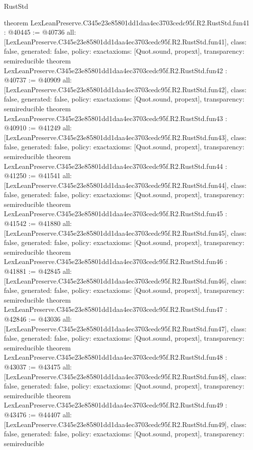 \begin{lexlean}{RustStd}
\begin{coremodule}
{}
theorem LexLeanPreserve.C345e23e85801dd1daa4ec3703cedc95f.R2.RustStd.fun41 : @40445 := @40736 {
  all: [LexLeanPreserve.C345e23e85801dd1daa4ec3703cedc95f.R2.RustStd.fun41],
  class: false,
  generated: false,
  policy: exact{axioms: [Quot.sound, propext]},
  transparency: semireducible
}
theorem LexLeanPreserve.C345e23e85801dd1daa4ec3703cedc95f.R2.RustStd.fun42 : @40737 := @40909 {
  all: [LexLeanPreserve.C345e23e85801dd1daa4ec3703cedc95f.R2.RustStd.fun42],
  class: false,
  generated: false,
  policy: exact{axioms: [Quot.sound, propext]},
  transparency: semireducible
}
theorem LexLeanPreserve.C345e23e85801dd1daa4ec3703cedc95f.R2.RustStd.fun43 : @40910 := @41249 {
  all: [LexLeanPreserve.C345e23e85801dd1daa4ec3703cedc95f.R2.RustStd.fun43],
  class: false,
  generated: false,
  policy: exact{axioms: [Quot.sound, propext]},
  transparency: semireducible
}
theorem LexLeanPreserve.C345e23e85801dd1daa4ec3703cedc95f.R2.RustStd.fun44 : @41250 := @41541 {
  all: [LexLeanPreserve.C345e23e85801dd1daa4ec3703cedc95f.R2.RustStd.fun44],
  class: false,
  generated: false,
  policy: exact{axioms: [Quot.sound, propext]},
  transparency: semireducible
}
theorem LexLeanPreserve.C345e23e85801dd1daa4ec3703cedc95f.R2.RustStd.fun45 : @41542 := @41880 {
  all: [LexLeanPreserve.C345e23e85801dd1daa4ec3703cedc95f.R2.RustStd.fun45],
  class: false,
  generated: false,
  policy: exact{axioms: [Quot.sound, propext]},
  transparency: semireducible
}
theorem LexLeanPreserve.C345e23e85801dd1daa4ec3703cedc95f.R2.RustStd.fun46 : @41881 := @42845 {
  all: [LexLeanPreserve.C345e23e85801dd1daa4ec3703cedc95f.R2.RustStd.fun46],
  class: false,
  generated: false,
  policy: exact{axioms: [Quot.sound, propext]},
  transparency: semireducible
}
theorem LexLeanPreserve.C345e23e85801dd1daa4ec3703cedc95f.R2.RustStd.fun47 : @42846 := @43036 {
  all: [LexLeanPreserve.C345e23e85801dd1daa4ec3703cedc95f.R2.RustStd.fun47],
  class: false,
  generated: false,
  policy: exact{axioms: [Quot.sound, propext]},
  transparency: semireducible
}
theorem LexLeanPreserve.C345e23e85801dd1daa4ec3703cedc95f.R2.RustStd.fun48 : @43037 := @43475 {
  all: [LexLeanPreserve.C345e23e85801dd1daa4ec3703cedc95f.R2.RustStd.fun48],
  class: false,
  generated: false,
  policy: exact{axioms: [Quot.sound, propext]},
  transparency: semireducible
}
theorem LexLeanPreserve.C345e23e85801dd1daa4ec3703cedc95f.R2.RustStd.fun49 : @43476 := @44407 {
  all: [LexLeanPreserve.C345e23e85801dd1daa4ec3703cedc95f.R2.RustStd.fun49],
  class: false,
  generated: false,
  policy: exact{axioms: [Quot.sound, propext]},
  transparency: semireducible
}
\end{coremodule}
\end{lexlean}
